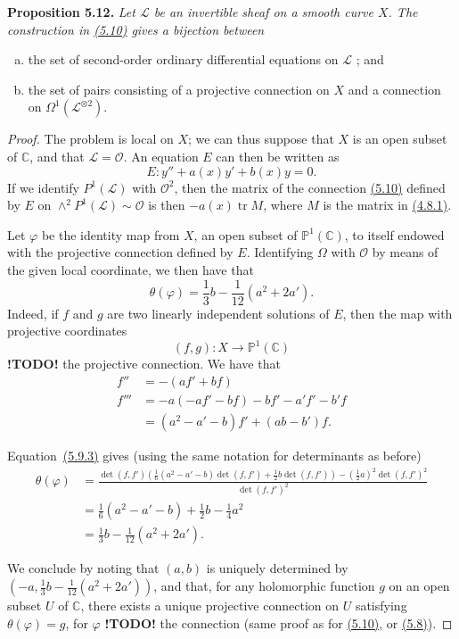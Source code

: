 \documentclass{report}
\newenvironment{itenv}[1]
  {\phantomsection\par\medskip\noindent\textbf{#1.}\itshape}
  {\medskip}
\newcommand{\scr}[1]{{\mathscr{#1}}}
\renewcommand{\cal}[1]{{\mathcal{#1}}}
\newcommand{\PP}{\mathbb{P}}
\newcommand{\CC}{\mathbb{C}}
\newcommand{\detrow}[2]{\operatorname{det}(#1,#2)}
\DeclareMathOperator{\tr}{tr}
\newcommand{\todo}{\textbf{ !TODO! }}
\newcommand{\oldpage}[1]{\marginpar{\footnotesize$\Big\vert$ \textit{p.~#1}}}
\begin{document}
\begin{itenv}{Proposition 5.12}
\label{I.5.12}
  Let $\scr{L}$ be an invertible sheaf on a smooth curve $X$.
  The construction in \hyperref[I.5.10]{(5.10)} gives a bijection between
  \begin{enumerate}[a)]
    \item the set of second-order ordinary differential equations on $\scr{L}$ ; and
\oldpage{36}
    \item the set of pairs consisting of a projective connection on $X$ and a connection on $\Omega^1(\scr{L}^{\otimes2})$.
  \end{enumerate}
\end{itenv}

\begin{proof}
  The problem is local on $X$;
  we can thus suppose that $X$ is an open subset of $\CC$, and that $\scr{L}=\cal{O}$.
  An equation $E$ can then be written as
  \[
    E\colon y'' + a(x)y' + b(x)y = 0.
  \]
  If we identify $P^1(\scr{L})$ with $\cal{O}^2$, then the matrix of the connection \hyperref[I.5.10]{(5.10)} defined by $E$ on $\wedge^2 P^1(\scr{L})\sim\cal{O}$ is then $-a(x)\tr M$, where $M$ is the matrix in \hyperref[I.4.8.1]{(4.8.1)}.

  Let $\varphi$ be the identity map from $X$, an open subset of $\PP^1(\CC)$, to itself endowed with the projective connection defined by $E$.
  Identifying $\Omega$ with $\cal{O}$ by means of the given local coordinate, we then have that
  \[
  \label{I.5.12.1}
    \theta(\varphi) = \frac13b - \frac{1}{12}(a^2+2a').
  \tag{5.12.1}
  \]
  Indeed, if $f$ and $g$ are two linearly independent solutions of $E$, then the map with projective coordinates
  \[
    (f,g)\colon X\to\PP^1(\CC)
  \]
  \todo the projective connection.
  We have that
  \[
    \begin{aligned}
      f''
      &= -(af'+bf)
    \\f'''
      &= -a(-af'-bf) - bf' - a'f' - b'f
    \\&= (a^2-a'-b)f' + (ab-b')f.
    \end{aligned}
  \]

  Equation~\hyperref[I.5.9.3]{(5.9.3)} gives (using the same notation for determinants as before)
  \[
    \begin{aligned}
      \theta(\varphi)
      &= \frac{
        \detrow{f}{f'}
        \left(
          \frac16(a^2-a'-b)\detrow{f}{f'}
          +\frac12 b\detrow{f}{f'}
        \right)
        - (\frac12a)^2\detrow{f}{f'}^2
      }{
        \detrow{f}{f'}^2
      }
    \\&= \frac16(a^2-a'-b) + \frac12 b - \frac14 a^2
    \\&= \frac13 b - \frac{1}{12}(a^2+2a').
    \end{aligned}
  \]

  We conclude by noting that $(a,b)$ is uniquely determined by $(-a,\frac13b-\frac{1}{12}(a^2+2a'))$, and that, for any holomorphic function $g$ on an open subset $U$ of $\CC$, there exists a unique projective connection on $U$ satisfying $\theta(\varphi)=g$, for $\varphi$ \todo the connection (same proof as for \hyperref[I.5.10]{(5.10)}, or \hyperref[I.5.8]{(5.8)}).
\end{proof}
\end{document}
